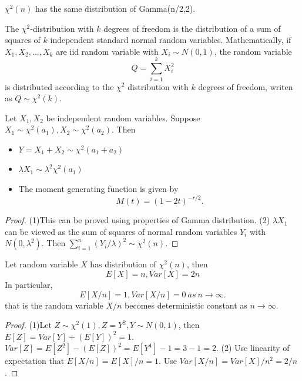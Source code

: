 \begin{refsection}
\begin{remark}
	$\chi^2(n)$ has the same distribution of Gamma(n/2,2).
\end{remark}

\begin{definition}[alternative]
The $\chi^2$-distribution with $k$ degrees of freedom is the distribution of a sum of squares of $k$ independent standard normal random variables. Mathematically, if $X_1,X_2,..., X_k$ are iid random variable with $X_i\sim N(0,1)$, the random variable $$Q=\sum_{i=1}^k X_i^2$$ is distributed according to the $\chi^2$ distribution with $k$ degrees of freedom, writen as $Q\sim \chi^2(k)$.	
\end{definition}

\begin{lemma}\cite[161-163]{hoggintroduction}\label{ch:theory-of-statistics:th:propertychisquare}
	Let $X_1,X_2$ be independent random variables. Suppose $X_1 \sim \chi^2(a_1),X_2\sim \chi^2(a_2)$. Then
	\begin{itemize}
		\item $Y = X_1+X_2 \sim \chi^2(a_1+a_2)$
		\item $\lambda X_1 \sim \lambda^2 \chi^2(a_1)$
		\item The moment generating function is given by
		$$M(t) = (1 - 2t)^{-r/2}.$$
	\end{itemize}
\end{lemma}
\begin{proof}
(1)This can be proved using properties of Gamma distribution.
(2) $\lambda X_1$ can be viewed as the sum of squares of normal random variables $Y_i$ with $N(0,\lambda^2)$.
Then $\sum_{i=1}^n (Y_i/\lambda)^2 \sim \chi^2(n) $. 
 
\end{proof}



\begin{lemma}\label{ch:theory-of-statistics:th:chi_expectationvariance}
Let random variable $X$ has distribution of $\chi^2(n)$, then
$$E[X] = n, Var[X] = 2n$$ 
In particular, $$E[X/n] = 1, Var[X/n] = 0 ~as~ n\to \infty.$$
that is the random variable $X/n$ becomes deterministic constant as $n\to \infty$.
\end{lemma}
\begin{proof}
(1)Let $Z\sim \chi^2(1), Z = Y^2, Y\sim N(0,1)$, then $E[Z] = Var[Y] + (E[Y])^2 = 1$.
$Var[Z] = E[Z^2] - (E[Z])^2 = E[Y^4] - 1 = 3 - 1 =2.$
(2) Use linearity of expectation that $E[X/n] = E[X]/n = 1$. Use $Var[X/n] = Var[X]/n^2 = 2/n$.
\end{proof}




\end{refsection}
